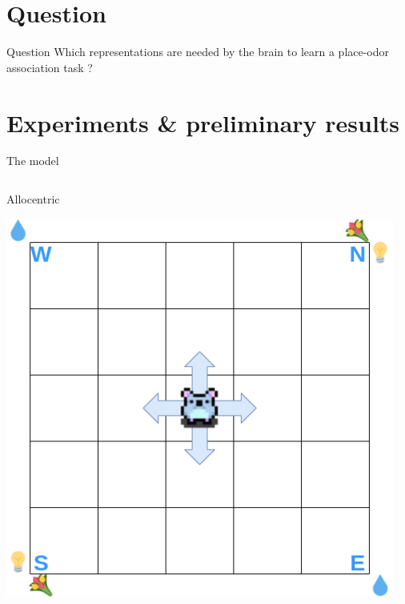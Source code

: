 \documentclass[bigger]{beamer}
\begin{document}
\section*{Question}
\label{sec:orgc2118bd}
\begin{frame}[fragile]{}
\begin{exampleblock}{Question}
Which representations are needed by the brain to learn a place-odor association task ?
\end{exampleblock}
\end{frame}
\section{Experiments \& preliminary results}
\label{sec:org0dbcc52}
\begin{frame}[label={sec:org961d1bb}]{The model}
\begin{columns}
\begin{column}{0.5\columnwidth}
\center
Allocentric
\begin{center}
\includegraphics[width=\textwidth]{img/RL_environment-Allo.drawio.png}
\end{center}
\end{column}
\begin{column}{0.5\columnwidth}
\end{column}
\end{columns}
\end{frame}
\end{document}

